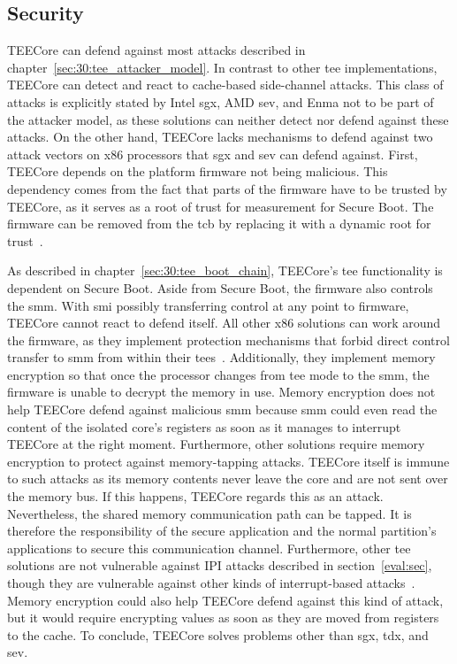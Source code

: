 \subsection{Security}
\label{eval:compare:security}
TEECore can defend against most attacks described in
chapter~\ref{sec:30:tee_attacker_model}. In contrast to other \gls{tee}
implementations, TEECore can detect and react to cache-based side-channel
attacks. This class of attacks is explicitly stated by Intel \gls{sgx}, AMD
\gls{sev}, and Enma not to be part of the attacker model, as these solutions can
neither detect nor defend against these attacks. On the other hand, TEECore
lacks mechanisms to defend against two attack vectors on x86 processors that
\gls{sgx} and \gls{sev} can defend against. First, TEECore depends on the
platform firmware not being malicious. This dependency comes from the fact that
parts of the firmware have to be trusted by TEECore, as it serves as a root of
trust for measurement for Secure Boot. The firmware can be removed from the
\gls{tcb} by replacing it with a dynamic root for
trust~\cite{mccune_flicker_2008,amd_manual,intel_sdm}.

As described in chapter~\ref{sec:30:tee_boot_chain}, TEECore's \gls{tee}
functionality is dependent on Secure Boot. Aside from Secure Boot, the firmware
also controls the \gls{smm}. With \gls{smi} possibly transferring control at any
point to firmware, TEECore cannot react to defend itself. All other x86
solutions can work around the firmware, as they implement protection mechanisms
that forbid direct control transfer to \gls{smm} from within their
\glspl{tee}~\cite{misono2024confidential, costan2016intel}. Additionally, they
implement memory encryption so that once the processor changes from \gls{tee}
mode to the \gls{smm}, the firmware is unable to decrypt the memory in use.
Memory encryption does not help TEECore defend against malicious \gls{smm}
because \gls{smm} could even read the content of the isolated core's registers
as soon as it manages to interrupt TEECore at the right moment. Furthermore,
other solutions require memory encryption to protect against memory-tapping
attacks. TEECore itself is immune to such attacks as its memory contents never
leave the core and are not sent over the memory bus. If this happens, TEECore
regards this as an attack. Nevertheless, the shared memory communication path
can be tapped. It is therefore the responsibility of the secure application and
the normal partition's applications to secure this communication channel.
Furthermore, other \gls{tee} solutions are not vulnerable against IPI attacks
described in section~\ref{eval:sec}, though they are vulnerable against other
kinds of interrupt-based attacks~\cite{van2017sgx, schluter2024heckler}. Memory
encryption could also help TEECore defend against this kind of attack, but it
would require encrypting values as soon as they are moved from registers to the
cache. To conclude, TEECore solves problems other than \gls{sgx}, \gls{tdx}, and
\gls{sev}. \\

